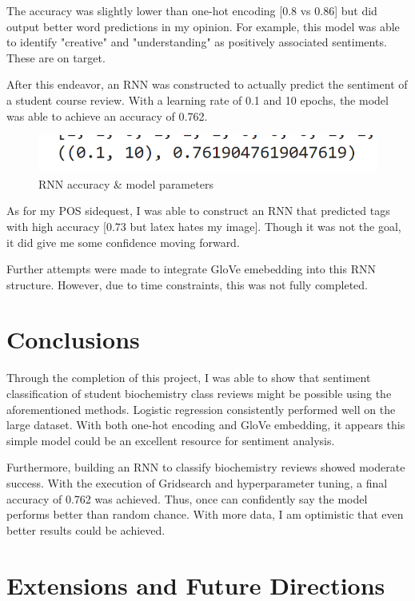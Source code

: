 \documentclass[11pt,a4paper]{article}
\begin{document}
The accuracy was slightly lower than one-hot encoding [0.8 vs 0.86] but did output better word predictions in my opinion. For example, this model was able to identify "creative" and "understanding" as positively associated sentiments. These are on target. 

After this endeavor, an RNN was constructed to actually predict the sentiment of a student course review. 
With a learning rate of 0.1 and 10 epochs, the model was able to achieve an accuracy of 0.762.

\begin{figure}[h]
    \centering
    \includegraphics[width=1\linewidth]{rnn_result.png}
    \caption{RNN accuracy \& model parameters}
\end{figure}

As for my POS sidequest, I was able to construct an RNN that predicted tags with high accuracy [0.73 but latex hates my image]. Though it was not the goal, it did give me some confidence moving forward. 

Further attempts were made to integrate GloVe emebedding into this RNN structure. However, due to time constraints, this was not fully completed.

\section{Conclusions}

Through the completion of this project, I was able to show that sentiment classification of student biochemistry class reviews might be possible using the aforementioned methods. Logistic regression consistently performed well on the large dataset. With both one-hot encoding and GloVe embedding, it appears this simple model could be an excellent resource for sentiment analysis.

Furthermore, building an RNN to classify biochemistry reviews showed moderate success. With the execution of Gridsearch and hyperparameter tuning, a final accuracy of 0.762 was achieved. Thus, once can confidently say the model performs better than random chance. With more data, I am optimistic that even better results could be achieved.



\section{Extensions and Future Directions}
\end{document}
